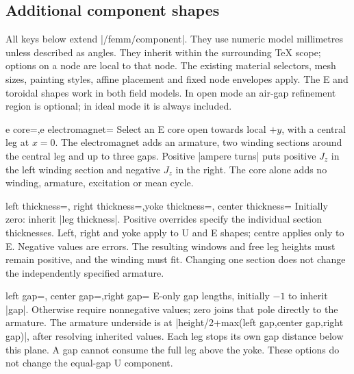 
\begin{codeexample}[width=0pt]
\begin{tikzpicture}
  \begin{axis}[width=9cm,height=5cm,grid=major,no markers,
    xlabel={$s$ (mm)},ylabel={$\int_0^s\mathbf H\cdot d\boldsymbol\ell$ (A)}]
    \femmplot[profile=variable,component=circulation]
  \end{axis}
\end{tikzpicture}
\end{codeexample}


\subsection{Additional component shapes}
All keys below extend |/femm/component|. They use numeric model millimetres
unless described as angles. They inherit within the surrounding TeX scope;
options on a node are local to that node. The existing material selectors,
mesh sizes, painting styles, affine placement and fixed node envelopes apply.
The E and toroidal shapes work in both field models. In open mode an air-gap
refinement region is optional; in ideal mode it is always included.

\begin{keylist}{e core=,e electromagnet=}
Select an E core open towards local $+y$, with a central leg at $x=0$.
The electromagnet adds an armature, two winding sections around the central
leg and up to three gaps. Positive |ampere turns| puts positive $J_z$ in
the left winding section and negative $J_z$ in the right. The core alone
adds no winding, armature, excitation or mean cycle.
\end{keylist}
\begin{keylist}{left thickness=,
 right thickness=,yoke thickness=,
 center thickness=}
Initially zero: inherit |leg thickness|. Positive overrides specify the
individual section thicknesses. Left, right and yoke apply to U and E shapes;
centre applies only to E. Negative values are errors. The resulting windows
and free leg heights must remain positive, and the winding must fit.
Changing one section does not change the independently specified armature.
\end{keylist}
\begin{keylist}{left gap=,
 center gap=,right gap=}
E-only gap lengths, initially $-1$ to inherit |gap|. Otherwise require
nonnegative values; zero joins that pole directly to the armature.
The armature underside is at |height/2+max(left gap,center gap,right gap)|,
after resolving inherited values. Each leg stops its own gap distance below
this plane. A gap cannot consume the full leg above the yoke. These options
do not change the equal-gap U component.
\end{keylist}

